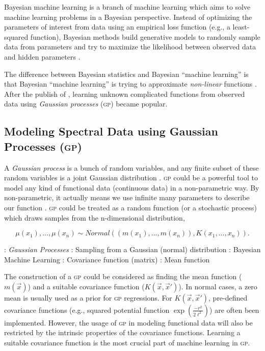 \documentclass{ar-1col}
\begin{document}
Bayesian machine learning is a branch of machine learning which aims to solve machine learning problems in a Bayesian perspective. 
Instead of optimizing the parameters of interest from data using an empirical loss function (e.g., a least-squared function), Bayesian methods build generative models to randomly sample data from parameters and try to maximize the likelihood between observed data and hidden parameters \citep{Barber2012}.

The difference between Bayesian statistics and Bayesian ``machine learning'' is that Bayesian ``machine learning'' is trying to approximate {\it non-linear} functions \citep{Bishop2003}. 
After the publish of \citet{Rasmussen2005}, learning unknown complicated functions from observed data using {\it Gaussian processes} (\textsc{gp}) became popular. 

\subsection{Modeling Spectral Data using Gaussian Processes (\textsc{gp})}

A {\it Gaussian process} is a bunch of random variables, and any finite subset of these random variables is a joint Gaussian distribution \citep{Rasmussen2005}. \textsc{gp} could be a powerful tool to model any kind of functional data (continuous data) in a non-parametric way. 
By non-parametric, it actually means we use infinite many parameters to describe our function \citep{Gelman04}. \textsc{gp} could be treated as a random function (or a stochastic process) which draws samples from the n-dimensional distribution, 

\begin{equation}
    \mu(x_1), ..., \mu(x_n) \sim Normal((m(x_1), ..., m(x_n)), K(x_1, ..., x_n)).
    \label{eq:GP}
\end{equation}

\begin{marginnote}[120pt]
    : \textit{Gaussian Processes}
    : Sampling from a Gaussian (normal) distribution
    : Bayesian Machine Learning    
    : Covariance function (matrix)
    \entry{$\mu$}: Mean function
\end{marginnote} 

The construction of a \textsc{gp} could be considered as finding the mean function ($m(\vec x)$) and a suitable covariance function ($K(\vec x, \vec x')$). 
In normal cases, a zero mean is usually used as a prior for \textsc{gp} regressions. For $K(\vec x, \vec x')$, pre-defined covariance functions (e.g., squared potential function $\exp{(\frac{-r^2}{2 \ell^2})}$) are often been implemented. 
However, the usage of \textsc{gp} in modeling functional data will also be restricted by the intrinsic properties of the covariance functions.
Learning a suitable covariance function is the most crucial part of machine learning in \textsc{gp}.
\end{document}
